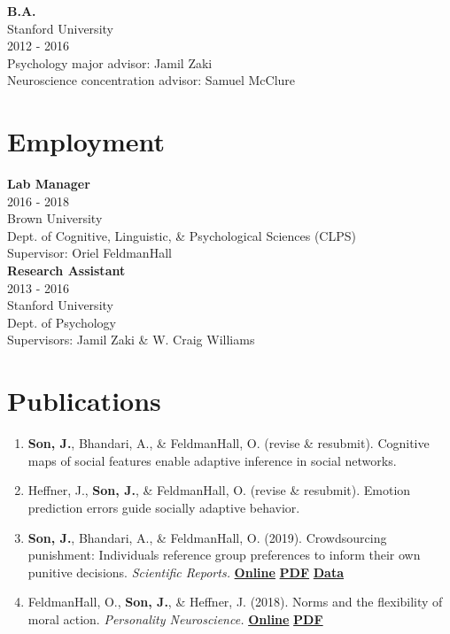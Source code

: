 \documentclass[
]{article}
\begin{document}
\textbf{B.A.}\\
Stanford University\\
2012 - 2016\\
Psychology major advisor: Jamil Zaki\\
Neuroscience concentration advisor: Samuel McClure

\hypertarget{employment}{%
\section{Employment}\label{employment}}

\textbf{Lab Manager}\\
2016 - 2018\\
Brown University\\
Dept. of Cognitive, Linguistic, \& Psychological Sciences (CLPS)\\
Supervisor: Oriel FeldmanHall\\

\textbf{Research Assistant}\\
2013 - 2016\\
Stanford University\\
Dept. of Psychology\\
Supervisors: Jamil Zaki \& W. Craig Williams

\hypertarget{publications}{%
\section{Publications}\label{publications}}

\begin{enumerate}
\def\labelenumi{\arabic{enumi}.}
\item
  \textbf{Son, J.}, Bhandari, A., \& FeldmanHall, O. (revise \&
  resubmit). Cognitive maps of social features enable adaptive inference
  in social networks.
\item
  Heffner, J., \textbf{Son, J.}, \& FeldmanHall, O. (revise \&
  resubmit). Emotion prediction errors guide socially adaptive behavior.
\item
  \textbf{Son, J.}, Bhandari, A., \& FeldmanHall, O. (2019).
  Crowdsourcing punishment: Individuals reference group preferences to
  inform their own punitive decisions. \emph{Scientific Reports.}
  \href{https://www.nature.com/articles/s41598-019-48050-2}{\textbf{Online}}
  \textbar{}
  \href{https://github.com/psychNerdJae/psychnerdjae.github.io/blob/main/papers/CrowdsourcingPunishment_SciRep_2019.pdf?raw=true}{\textbf{PDF}}
  \textbar{} \href{https://osf.io/8ka47/}{\textbf{Data}}
\item
  FeldmanHall, O., \textbf{Son, J.}, \& Heffner, J. (2018). Norms and
  the flexibility of moral action. \emph{Personality Neuroscience.}
  \href{https://www.cambridge.org/core/journals/personality-neuroscience/article/norms-and-the-flexibility-of-moral-action/A8A5140A517ECEE314A21FF9FE0E9EED}{\textbf{Online}}
  \textbar{}
  \href{https://github.com/psychNerdJae/psychnerdjae.github.io/blob/main/papers/NormsMoralAction_PN_2018.pdf?raw=true}{\textbf{PDF}}
\end{enumerate}
\end{document}
